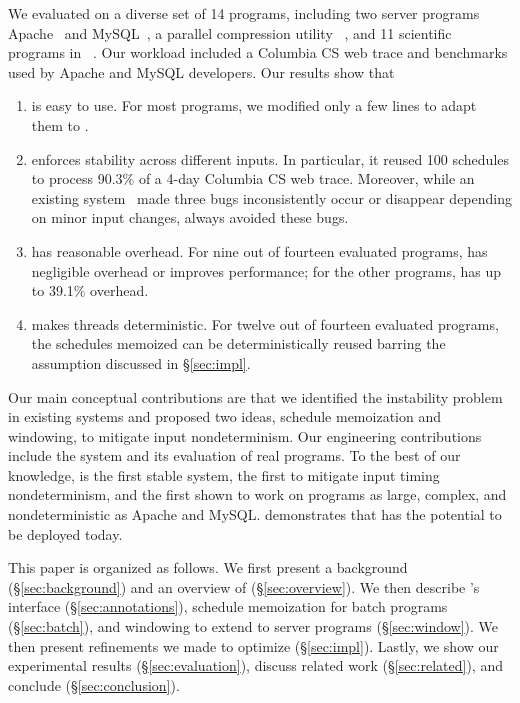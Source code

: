 We evaluated \tern on a diverse set of 14 programs, including two server
programs Apache~\cite{apache} and MySQL~\cite{mysql}, a parallel
compression utility \pbzip~\cite{pbzip2}, and 11 scientific programs in
\splash~\cite{splash2}.  Our workload included a Columbia CS web trace and
benchmarks used by Apache and MySQL developers.  Our results show that

\begin{enumerate}

\item \tern is easy to use.  For most programs, we modified only a few
  lines to adapt them to \tern.

\item \tern enforces stability across different inputs.  In particular, it
  reused 100 schedules to process 90.3\% of a 4-day Columbia CS web trace.
  Moreover, while an existing \dmt system~\cite{coredet:asplos10} made
  three bugs inconsistently occur or disappear depending on minor input
  changes, \tern always avoided these bugs.

\item \tern has reasonable overhead.  For nine out of fourteen
  evaluated programs, \tern has negligible overhead or improves
  performance; for the other programs, \tern has up to 39.1\%
  overhead.

\item \tern makes threads deterministic.  For twelve out of fourteen
  evaluated programs, the schedules \tern memoized can be deterministically
  reused barring the assumption discussed in \S\ref{sec:impl}.

\end{enumerate}

Our main conceptual contributions are that we identified the instability
problem in existing \dmt systems and proposed two ideas, schedule
memoization and windowing, to mitigate input nondeterminism.  Our
engineering contributions include the \tern system and its evaluation of
real programs.  To the best of our knowledge, \tern is the first stable
\dmt system, the first to mitigate input timing nondeterminism, and the
first shown to work on programs as large, complex, and nondeterministic as
Apache and MySQL.  \tern demonstrates that \dmt has the potential to be
deployed today.

This paper is organized as follows.  We first present a background
(\S\ref{sec:background}) and an overview of \tern (\S\ref{sec:overview}).
We then describe \tern's interface (\S\ref{sec:annotations}), schedule
memoization for batch programs (\S\ref{sec:batch}), and windowing to
extend \tern to server programs (\S\ref{sec:window}).  We then present 
refinements we made to optimize \tern (\S\ref{sec:impl}).  Lastly, we show
our experimental results (\S\ref{sec:evaluation}), discuss related work
(\S\ref{sec:related}), and conclude (\S\ref{sec:conclusion}).
